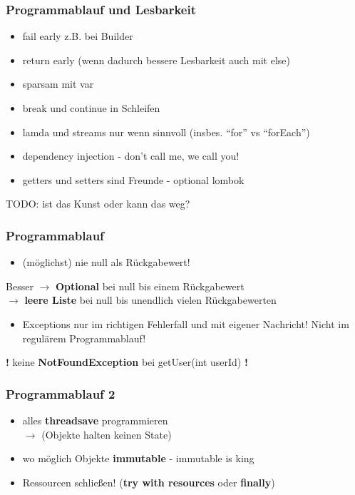 \begin{frame}
\frametitle{Programmablauf und Lesbarkeit}
  \begin{itemize}
    \item fail early z.B. bei Builder
    \item return early (wenn dadurch bessere Lesbarkeit auch mit else)
    \item sparsam mit var
    \item break und continue in Schleifen
    \item lamda und streams nur wenn sinnvoll (insbes. ``for'' vs ``forEach'')
    \item dependency injection - don't call me, we call you!
    \item getters und setters sind Freunde - optional lombok
    \end{itemize}
  \begin{Beispiel}
  \par TODO: ist das Kunst oder kann das weg?
  \end{Beispiel}
\end{frame}

\begin{frame}
\frametitle{Programmablauf}
  \begin{itemize}
    \item (möglichst) nie null als Rückgabewert!
  \end{itemize}
  \begin{block}{Besser}
    $\rightarrow$ \textbf{Optional} bei null bis einem Rückgabewert\\
    \vspace{2mm}
    $\rightarrow$ \textbf{leere Liste} bei null bis unendlich vielen Rückgabewerten\\
  \end{block}
  \vspace{4mm}
  \begin{itemize}
    \item Exceptions nur im richtigen Fehlerfall und mit eigener Nachricht! Nicht im regulärem Programmablauf!
  \end{itemize}
  \begin{block}{}
    \par \centering \textbf{!} keine \textbf{NotFoundException} bei getUser(int userId) \textbf{!}
  \end{block}
\end{frame}

\begin{frame}
\frametitle{Programmablauf 2}
\begin{itemize}
  \item alles \textbf{threadsave} programmieren \\ 
  $\rightarrow$ (Objekte halten keinen State)
  \vspace{2mm}
  \item wo möglich Objekte \textbf{immutable} - immutable is king
  \vspace{2mm}
  \item Ressourcen schließen! (\textbf{try with resources} oder \textbf{finally})
\end{itemize}
\end{frame}


